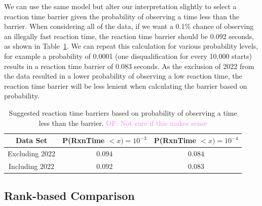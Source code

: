 \documentclass[12pt, letterpaper, titlepage]{article}
\newcommand{\of}[1]{\textcolor{violet}{OF: #1}}
\begin{document}
We can use the same model but alter our interpretation slightly to select a 
reaction time barrier given the probability of observing a time less than the 
barrier.  When considering all of the data, if we want a 0.1\% chance of 
observing an illegally fast reaction time, the reaction
time barrier should be 0.092 seconds, as shown in Table~\ref{tab:Sim_time}.  We
can repeat this calculation for various probability levels,
for example a probability of 0.0001 (one disqualification for every 10,000 starts)
results in a reaction time barrier of 0.083 seconds.  As the exclusion of 2022
from the data resulted in a lower probability of observing a low reaction time,
the reaction time barrier will be less lenient when calculating the barrier
based on probability.


\begin{table}
  \centering
  \caption{Suggested reaction time barriers based on probability of observing
  a time less than the barrier. \of{Not sure if this makes sense}}
  \begin{tabular}{c c c} 
   \toprule
   Data Set & P(RxnTime $< x) = 10^{-3}$ & P(RxnTime $< x) = 10^{-4}$ \\ 
   \midrule
   Excluding 2022 & $0.094$ & $0.084$ \\ 
   Including 2022 & $0.092$ & $0.083$ \\
   \bottomrule
  \end{tabular}
  \label{tab:Sim_time}
\end{table}




\subsection{Rank-based Comparison} \label{subsec:Results_Rank}
\end{document}
